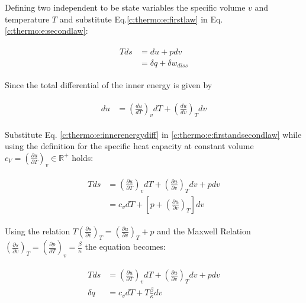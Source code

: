 Defining two independent to be state variables the specific volume $v$ and temperature $T$ and substitute Eq.\ref{c:thermo:e:firstlaw} in Eq.\ref{c:thermo:e:secondlaw}:

\begin{align}
\begin{split}
T ds &= du + p dv \\
&= \delta q  + \delta w_{diss}
\end{split}
\label{c:thermo:e:firstandsecondlaw}
\end{align}

Since the total differential of the inner energy is given by


\begin{align}
\begin{split}
du &= \left( \frac{du}{dT} \right)_v dT  + \left( \frac{du}{dv} \right)_T dv
\end{split}
\label{c:thermo:e:innerenergydiff}
\end{align}

Substitute Eq. \ref{c:thermo:e:innerenergydiff} in \ref{c:thermo:e:firstandsecondlaw} while using the definition for the specific heat capacity at constant volume $c_V = \left(\frac{\partial u}{\partial T}\right)_v \in \mathbb{R}^+$ holds:

\begin{align*}
\begin{split}
T ds &= \left( \frac{\partial u}{\partial T} \right)_v dT  + \left( \frac{\partial u}{ \partial v} \right)_T dv + p dv \\
&= c_v dT + \left[ p + \left( \frac{\partial u}{\partial v}\right)_T\right] dv
\end{split}
\end{align*}

Using the relation \cite[p.375]{Struchtrup2014} $T\left( \frac{\partial s}{\partial v}\right)_T = \left( \frac{\partial u}{\partial v}\right)_T + p $ and the Maxwell Relation $\left( \frac{\partial s}{\partial v}\right)_T = \left( \frac{\partial p}{\partial T}\right)_v = \frac{\beta}{\kappa} $ the equation becomes:

\begin{align}
\begin{split}
T ds &= \left( \frac{\partial u}{\partial T} \right)_v dT  + \left( \frac{\partial u}{ \partial v} \right)_T dv + p dv \\
\delta q &= c_v dT + T \frac{\beta}{\kappa} dv
\end{split}
\label{c:thermo:e:isobaricHeat}
\end{align}

